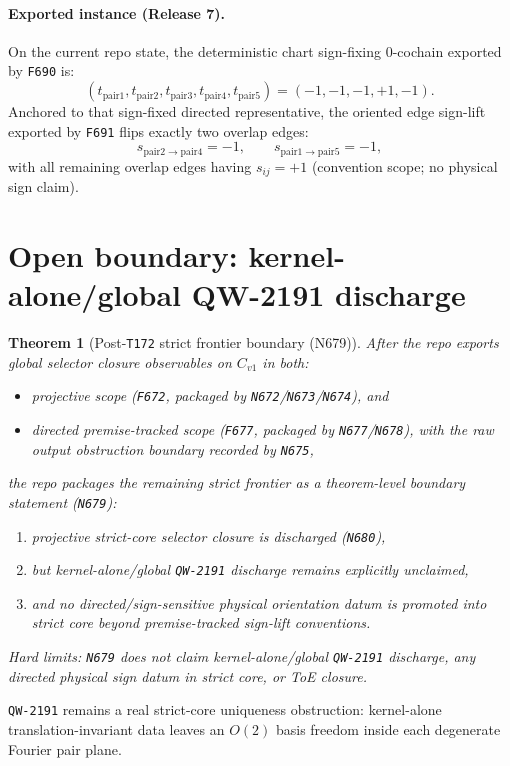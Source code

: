\documentclass[11pt,a4paper]{article}
\newtheorem{theorem}{Theorem}[section]
\begin{document}
\paragraph{Exported instance (Release 7).}
On the current repo state, the deterministic chart sign-fixing $0$-cochain exported by \texttt{F690} is:
\[
(t_{\mathrm{pair1}},t_{\mathrm{pair2}},t_{\mathrm{pair3}},t_{\mathrm{pair4}},t_{\mathrm{pair5}})
=
(-1,-1,-1,+1,-1).
\]
Anchored to that sign-fixed directed representative, the oriented edge sign-lift exported by \texttt{F691} flips exactly two overlap edges:
\[
s_{\mathrm{pair2\to pair4}}=-1,\qquad s_{\mathrm{pair1\to pair5}}=-1,
\]
with all remaining overlap edges having $s_{ij}=+1$ (convention scope; no physical sign claim).
\section{Open boundary: kernel-alone/global QW-2191 discharge}

\begin{theorem}[Post-\texttt{T172} strict frontier boundary (N679)]
After the repo exports global selector closure observables on $C_{v1}$ in both:
\begin{itemize}
  \item projective scope (\texttt{F672}, packaged by \texttt{N672}/\texttt{N673}/\texttt{N674}), and
  \item directed premise-tracked scope (\texttt{F677}, packaged by \texttt{N677}/\texttt{N678}), with the raw output obstruction boundary recorded by \texttt{N675},
\end{itemize}
the repo packages the remaining strict frontier as a theorem-level boundary statement (\texttt{N679}):
\begin{enumerate}[label=\arabic*.]
  \item projective strict-core selector closure is discharged (\texttt{N680}),
  \item but kernel-alone/global \texttt{QW-2191} discharge remains explicitly unclaimed,
  \item and no directed/sign-sensitive physical orientation datum is promoted into strict core beyond premise-tracked sign-lift conventions.
\end{enumerate}
\emph{Hard limits:} \texttt{N679} does not claim kernel-alone/global \texttt{QW-2191} discharge, any directed physical sign datum in strict core, or ToE closure.
\end{theorem}

\texttt{QW-2191} remains a real strict-core uniqueness obstruction: kernel-alone translation-invariant data leaves an $O(2)$ basis freedom inside each degenerate Fourier pair plane.
\end{document}

